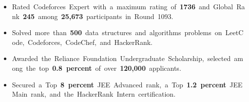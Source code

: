 \documentclass[a4paper,10pt]{article}
\newcommand{\resumeItem}[1]{\item #1}
\begin{document}
\begin{itemize}
  \resumeItem{\mbox{Rated Codeforces Expert with a maximum rating of \textbf{1736} and Global Rank \textbf{245} among \textbf{25,673} participants in Round 1093.}}
  \resumeItem{\mbox{Solved more than \textbf{500} data structures and algorithms problems on LeetCode, Codeforces, CodeChef, and HackerRank.}}
  \resumeItem{\mbox{Awarded the Reliance Foundation Undergraduate Scholarship, selected among the top \textbf{0.8 percent} of over \textbf{120,000} applicants.}}
  \resumeItem{\mbox{Secured a Top \textbf{8 percent} JEE Advanced rank, a Top \textbf{1.2 percent} JEE Main rank, and the HackerRank Intern certification.}}
\end{itemize}
\end{document}
